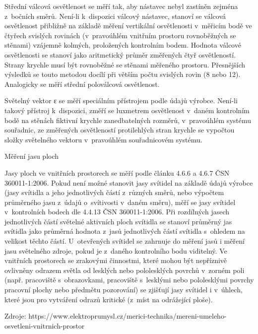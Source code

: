 \medskip
Střední válcová osvětlenost se měří tak, aby nástavec nebyl zastíněn zejména z~bočních směrů.
Není-li k~dispozici válcový nástavec, stanoví se válcová osvětlenost přibližně na základě měření
vertikální osvětlenosti v~měřicím bodě ve čtyřech svislých rovinách (v~pravoúhlém vnitřním prostoru
rovnoběžných se stěnami) vzájemně kolmých, proložených kontrolním bodem. Hodnota válcové osvětlenosti
se stanoví jako aritmetický průměr změřených čtyř osvětleností. Strany krychle musí být rovnoběžné
se stěnami měřeného prostoru. Přesnějších výsledků se touto metodou docílí při větším počtu svislých
rovin (8 nebo 12). Analogicky se měří střední poloválcová osvětlenost.

\medskip
Světelný vektor ε se měří speciálním přístrojem podle údajů výrobce. Není-li takový přístroj k~dispozici,
změří se luxmetrem osvětlenost v~daném kontrolním bodě na stěnách fiktivní krychle zanedbatelných rozměrů,
v~pravoúhlém systému souřadnic, ze změřených osvětleností protilehlých stran krychle se vypočtou složky
světelného vektoru v~pravoúhlém souřadnicovém systému.

\sec Měření jasu ploch

Jasy ploch ve vnitřních prostorech se měří podle článku 4.6.6 a 4.6.7 ČSN 360011-1:2006. Pokud není
možné stanovit jasy svítidel na základě údajů výrobce (jasy svítidla a jeho jednotlivých částí z~různých
směrů, nebo výpočtem průměrného jasu z~údajů o~svítivosti v~daném směru), měří se jasy svítidel v~kontrolních
bodech dle 4.4.13 ČSN 360011-1:2006.
\medskip
Při rozdílných jasech jednotlivých částí světelné aktivních ploch svítidla se stanoví průměrný jas
svítidla jako průměrná hodnota z~jasů jednotlivých částí svítidla s~ohledem na velikost těchto částí.
U~otevřených svítidel se zahrnuje do měření jasů i měření jasu světelného zdroje, pokud je z~daného
kontrolního bodu viditelný.
\medskip
Ve vnitřních prostorech se zrakovými činnostmi, které mohou být nepříznivě ovlivněny odrazem světla
od lesklých nebo pololesklých povrchů v~zorném poli (např. pracoviště s~obrazovkami, pracoviště s~lesklými
nebo pololesklými povrchy pracovní plochy nebo předmětu pozorování) se zjišťují jasy svítidel i v~úhlech,
které jsou pro vytváření odrazů kritické (z~míst na odrážející ploše).

\medskip
Zdroje: https://www.elektroprumysl.cz/merici-technika/mereni-umeleho-osvetleni-vnitrnich-prostor